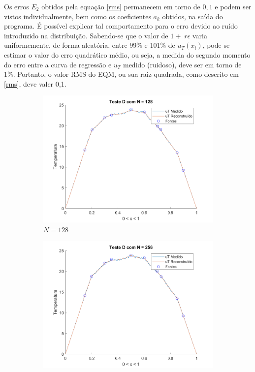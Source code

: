 \documentclass[12pt]{article}
\begin{document}
\begin{spacing}{1.5}
Os erros $E_2$ obtidos pela equação \eqref{rms} permanecem em torno de $0,1$ e podem ser vistos individualmente, bem como os coeficientes $a_k$ obtidos, na saída do programa. É possível explicar tal comportamento para o erro devido ao ruído introduzido na distribuição. Sabendo-se que o valor de $1 +\;r \epsilon$ varia uniformemente, de forma aleatória, entre 99\% e 101\% de $u_T(x_i)$, pode-se estimar o valor do erro quadrático médio, ou seja, a medida do segundo momento\supercite{moment} do erro entre a curva de regressão e $u_T$ medido (ruidoso), deve ser em torno de 1\%. Portanto, o valor RMS do EQM, ou sua raiz quadrada, como descrito em \eqref{rms}, deve valer 0,1.

\begin{figure}[H]
\centering
\caption{Distribuição de temperatura do teste D}
\captionsetup[subfigure]{justification=centering}
    \begin{subfigure}[t]{.485\linewidth}
        \centering
        \includegraphics[width=1\linewidth]{Imagens/FigD128.png}
        \caption{$N=128$}
        \label{fig:testeD_128}
    \end{subfigure}
    \begin{subfigure}[t]{.485\linewidth}
        \centering
        \includegraphics[width=1\linewidth]{Imagens/FigD256.png}

\end{subfigure}
\end{figure}
\end{spacing}
\end{document}
